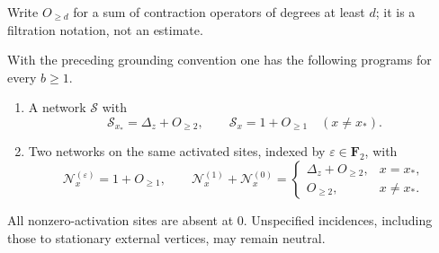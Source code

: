 Write $O_{\ge d}$ for a sum of contraction operators of degrees at least
$d$; it is a filtration notation, not an estimate.

\begin{lemma}\label{gr:programs}
With the preceding grounding convention one has the following programs
for every $b\ge1$.
\begin{enumerate}
\item A network $\mathcal S$ with
\[
 \mathcal S_{x_*}=\Delta_z+O_{\ge2},\qquad
 \mathcal S_x=1+O_{\ge1}\quad(x\ne x_*).
\]
\item Two networks on the same activated sites, indexed by
$\varepsilon\in\mathbf F_2$, with
\[
 \mathcal N_x^{(\varepsilon)}=1+O_{\ge1},\qquad
 \mathcal N_x^{(1)}+\mathcal N_x^{(0)}
 =\begin{cases}\Delta_z+O_{\ge2},&x=x_*,\\
 O_{\ge2},&x\ne x_*.
 \end{cases}
\]
\end{enumerate}
All nonzero-activation sites are absent at $0$.  Unspecified incidences,
including those to stationary external vertices, may remain neutral.
\end{lemma}


